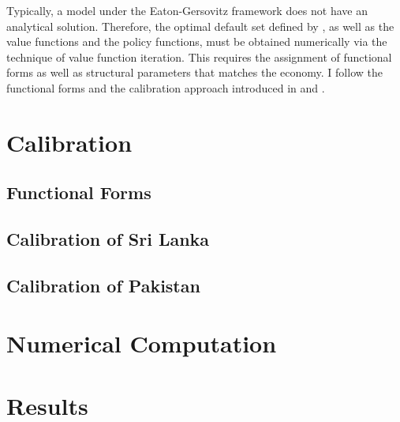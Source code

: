 Typically, a model under the Eaton-Gersovitz framework does not have an analytical solution. Therefore, the optimal default set defined by , as well as the value functions and the policy functions, must be obtained numerically via the technique of value function iteration.
This requires the assignment of functional forms as well as structural parameters that matches the economy.
I follow the functional forms and the calibration approach introduced in \citet{Na-18} and \citet{Hinrichsen_2020-chapter4}.

\section{Calibration}
\label{sec: calibration}
\subsection*{Functional Forms}


\subsection*{Calibration of Sri Lanka}
\label{sec: cal-sri}


\subsection*{Calibration of Pakistan}
\label{sec: cal-pak}


\section{Numerical Computation}
\label{sec:computation}


\section{Results}